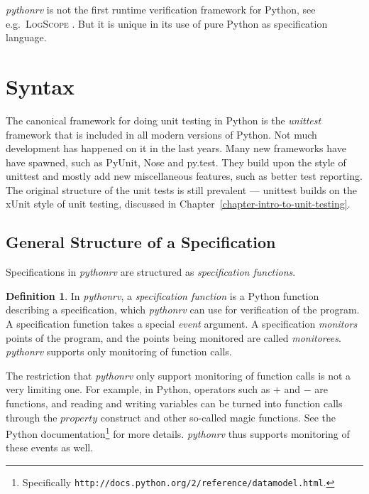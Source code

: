 \documentclass[a4paper,11pt]{kth-mag}
\theoremstyle{definition}
\newtheorem{mydef}{Definition}
\begin{document}
\textit{pythonrv} is not the first runtime verification framework for Python,
see e.g.\ \textsc{LogScope} \cite{barringer09tutorial}. But it is unique in its
use of pure Python as specification language.


\section{Syntax} \label{section-approach-syntax}

The canonical framework for doing unit testing in Python is the
\textit{unittest} framework that is included in all modern versions of Python.
Not much development has happened on it in the last years. Many new frameworks
have have spawned, such as PyUnit, Nose and py.test. They build upon the style
of unittest and mostly add new miscellaneous features, such as better test
reporting. The original structure of the unit tests is still prevalent ---
unittest builds on the xUnit style of unit testing, discussed in
Chapter~\ref{chapter-intro-to-unit-testing}.

\subsection{General Structure of a Specification}

Specifications in \textit{pythonrv} are structured as \textit{specification
functions}.

\begin{mydef}\label{def-specification-function}
In \textit{pythonrv}, a \textit{specification function} is a Python function
describing a specification, which \textit{pythonrv} can use for verification of
the program. A specification function takes a special \textit{event} argument.
A specification \textit{monitors} points of the program, and the points being
monitored are called \textit{monitorees}. \textit{pythonrv} supports only
monitoring of function calls.
\end{mydef}

The restriction that \textit{pythonrv} only support monitoring of function
calls is not a very limiting one. For example, in Python, operators such as $+$
and $-$ are functions, and reading and writing variables can be turned into
function calls through the $property$ construct and other so-called magic
functions. See the Python documentation\footnote{Specifically
\texttt{http://docs.python.org/2/reference/datamodel.html}.} for more details.
\textit{pythonrv} thus supports monitoring of these events as well.
\end{document}
